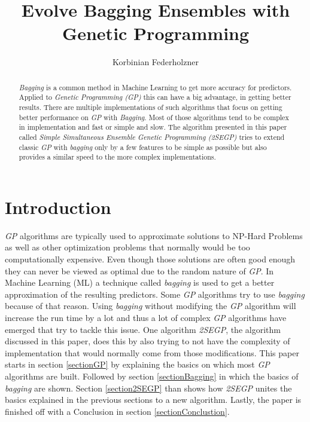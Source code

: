 \documentclass[tikz, runningheads]{llncs}
\begin{document}
%
\title{Evolve Bagging Ensembles with Genetic Programming}
%
%
\author{Korbinian Federholzner}
%

%

%
\maketitle              %
%
\begin{abstract}
\textit{Bagging} is a common method in Machine Learning to get more accuracy for predictors. Applied to \textit{Genetic Programming (GP)} 
this can have a big advantage, in getting better results. There are multiple implementations of such algorithms that focus on getting better performance on 
\textit{GP} with \textit{Bagging}. Most of those algorithms tend to be complex in implementation and fast or simple and slow.
The algorithm presented in this paper called \textit{Simple Simultaneous Ensemble Genetic Programming (2SEGP)} tries to extend classic \textit{GP} with \textit{bagging} only by a few features to 
be simple as possible but also provides a similar speed to the more complex implementations. 

\end{abstract}
%
%
%
\section{Introduction}
\textit{GP} algorithms are typically used to approximate solutions to NP-Hard Problems as well as 
other optimization problems that normally would be too computationally expensive. 
Even though those solutions are often good enough they can never be viewed as optimal due to the random 
nature of \textit{GP}. In Machine Learning (ML) a technique called \textit{bagging} is used to get a better approximation of the 
resulting predictors. Some \textit{GP} algorithms try to use \textit{bagging} because of that reason. Using \textit{bagging} without modifying 
the \textit{GP} algorithm will increase the run time by a lot and thus a lot of complex \textit{GP} algorithms have emerged that 
try to tackle this issue. One algorithm \textit{2SEGP}, the algorithm discussed in this paper, does this by also trying to not have the 
complexity of implementation that would normally come from those modifications. This paper starts in section \ref{sectionGP} 
by explaining the basics on which most \textit{GP} algorithms are built. Followed by section \ref{sectionBagging} in which 
the basics of \textit{bagging} are shown. Section \ref{section2SEGP} than shows how \textit{2SEGP} unites the basics explained 
in the previous sections to a new algorithm. Lastly, the paper is finished off with a Conclusion in section 
\ref{sectionConclustion}.
\end{document}
